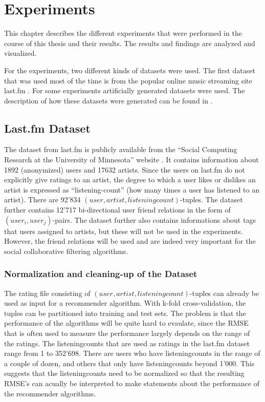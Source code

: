 \chapter{Experiments}
\label{c:experiments} This chapter describes the different experiments that were performed in the course of this thesis and their results. The results and findings are analyzed and visualized.

For the experiments, two different kinds of datasets were used. The first dataset that was used most of the time is from the popular online music streaming site last.fm \cite{Lastfm}. For some experiments artificially generated datasets were used. The description of how these datasets were generated can be found in %
.

\section{Last.fm Dataset}
\label{st:lastfmdataset} The dataset from last.fm is publicly available from the ``Social Computing Research at the University of Minnesota'' website \cite{Grouplens}. It contains information about 1892 (anonymized) users and 17632 artists. Since the users on last.fm do not explicitly give ratings to an artist, the degree to which a user likes or dislikes an artist is expressed as ``listening-count'' (how many times a user has listened to an artist). There are 92'834 $(user, artist, listeningcount)$-tuples. The dataset further contains 12'717 bi-directional user friend relations in the form of $(user_i, user_j)$-pairs. The dataset further also contains informations about tags that users assigned to artists, but these will not be used in the experiments. However, the friend relations will be used and are indeed very important for the social collaborative filtering algorithms.

\subsection{Normalization and cleaning-up of the Dataset}
\label{sst:normalizationandcleaningup} The rating file consisting of $(user, artist, listeningcount)$-tuples can already be used as input for a recommender algorithm. With k-fold cross-validation, the tuples can be partitioned into training and test sets. The problem is that the performance of the algorithms will be quite hard to evaulate, since the RMSE that is often used to measure the performance largely depends on the range of the ratings. The listeningcounts that are used as ratings in the last.fm dataset range from 1 to 352'698. There are users who have listeningcounts in the range of a couple of dozen, and others that only have listeningcounts beyond 1'000. This suggests that the listeningcounts need to be normalized so that the resulting RMSE's can acually be interpreted to make statements about the performance of the recommender algorithms.

